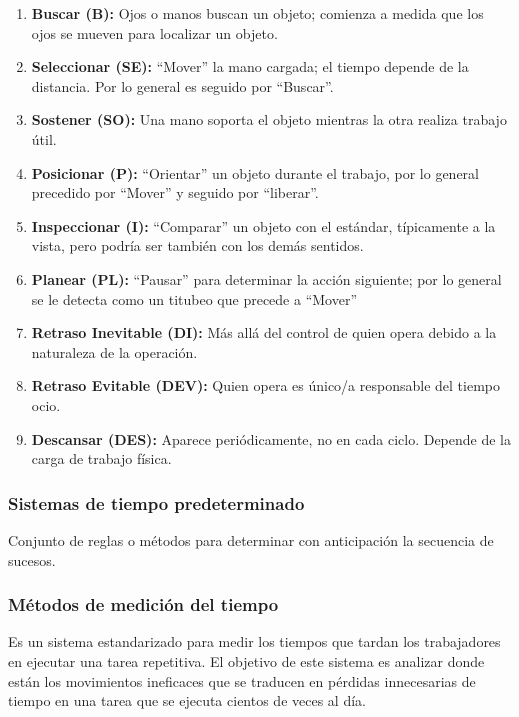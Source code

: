 \begin{enumerate}
    \item \textbf{Buscar (B):} Ojos o manos buscan un objeto; comienza a medida que los ojos se mueven para localizar un objeto.
    \item \textbf{Seleccionar (SE):} “Mover” la mano cargada; el tiempo depende de la distancia. Por lo general es seguido por “Buscar”.
    \item \textbf{Sostener (SO):} Una mano soporta el objeto mientras la otra realiza trabajo útil.
    \item \textbf{Posicionar (P):} “Orientar” un objeto durante el trabajo, por lo general precedido por “Mover” y seguido por “liberar”.
    \item \textbf{Inspeccionar (I):} “Comparar” un objeto con el estándar, típicamente a la vista, pero podría ser también con los demás sentidos.
    \item \textbf{Planear (PL):} “Pausar” para determinar la acción siguiente; por lo general se le detecta como un titubeo que precede a “Mover”
    \item \textbf{Retraso Inevitable (DI):} Más allá del control de quien opera debido a la naturaleza de la operación.
    \item \textbf{Retraso Evitable (DEV):} Quien opera es único/a responsable del tiempo ocio.
    \item \textbf{Descansar (DES):} Aparece periódicamente, no en cada ciclo. Depende de la carga de trabajo física.

\end{enumerate}

\subsubsection{Sistemas de tiempo predeterminado}

Conjunto de reglas o métodos para determinar con anticipación la secuencia de sucesos.

\subsubsection{Métodos de medición del tiempo}

 Es un sistema estandarizado para medir los tiempos que tardan los trabajadores en ejecutar una tarea repetitiva. El objetivo de este sistema es analizar donde están los movimientos ineficaces que se traducen en pérdidas innecesarias de tiempo en una tarea que se ejecuta cientos de veces al día. \cite{DanielGrifol}


